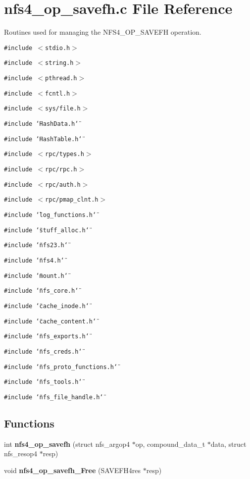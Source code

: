 \section{nfs4\_\-op\_\-savefh.c File Reference}
\label{nfs4__op__savefh_8c}
Routines used for managing the NFS4\_\-OP\_\-SAVEFH operation. 

{\tt \#include $<$stdio.h$>$}\par
{\tt \#include $<$string.h$>$}\par
{\tt \#include $<$pthread.h$>$}\par
{\tt \#include $<$fcntl.h$>$}\par
{\tt \#include $<$sys/file.h$>$}\par
{\tt \#include \char`\"{}Hash\-Data.h\char`\"{}}\par
{\tt \#include \char`\"{}Hash\-Table.h\char`\"{}}\par
{\tt \#include $<$rpc/types.h$>$}\par
{\tt \#include $<$rpc/rpc.h$>$}\par
{\tt \#include $<$rpc/auth.h$>$}\par
{\tt \#include $<$rpc/pmap\_\-clnt.h$>$}\par
{\tt \#include \char`\"{}log\_\-functions.h\char`\"{}}\par
{\tt \#include \char`\"{}stuff\_\-alloc.h\char`\"{}}\par
{\tt \#include \char`\"{}nfs23.h\char`\"{}}\par
{\tt \#include \char`\"{}nfs4.h\char`\"{}}\par
{\tt \#include \char`\"{}mount.h\char`\"{}}\par
{\tt \#include \char`\"{}nfs\_\-core.h\char`\"{}}\par
{\tt \#include \char`\"{}cache\_\-inode.h\char`\"{}}\par
{\tt \#include \char`\"{}cache\_\-content.h\char`\"{}}\par
{\tt \#include \char`\"{}nfs\_\-exports.h\char`\"{}}\par
{\tt \#include \char`\"{}nfs\_\-creds.h\char`\"{}}\par
{\tt \#include \char`\"{}nfs\_\-proto\_\-functions.h\char`\"{}}\par
{\tt \#include \char`\"{}nfs\_\-tools.h\char`\"{}}\par
{\tt \#include \char`\"{}nfs\_\-file\_\-handle.h\char`\"{}}\par
\subsection*{Functions}
\begin{CompactItemize}
\item 
int {\bf nfs4\_\-op\_\-savefh} (struct nfs\_\-argop4 $\ast$op, compound\_\-data\_\-t $\ast$data, struct nfs\_\-resop4 $\ast$resp)
\item 
void {\bf nfs4\_\-op\_\-savefh\_\-Free} (SAVEFH4res $\ast$resp)
\end{CompactItemize}


